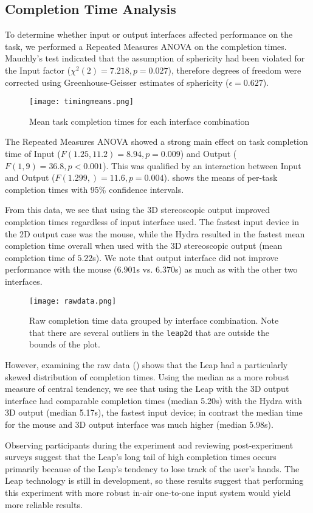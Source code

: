 \subsection{Completion Time Analysis}\label{sec:timing}
To determine whether input or output interfaces affected performance on the
task, we performed a Repeated Measures ANOVA on the completion times.
Mauchly's test indicated that the assumption of sphericity had been violated
for the Input factor ($\chi^2(2) = 7.218, p = 0.027$), therefore degrees of
freedom were corrected using Greenhouse-Geisser estimates of sphericity
($\epsilon = 0.627$).

\begin{figure}
    \centering
    \texttt{[image: timingmeans.png]}
    \caption{Mean task completion times for each interface combination}
    \label{fig:means}
\end{figure}

The Repeated Measures ANOVA showed a strong main effect on task
completion time of Input ($F(1.25,11.2) = 8.94, p = 0.009$) and Output ($F(1,9)
= 36.8, p < 0.001$). This was qualified by an interaction between Input and
Output ($F(1.299,) = 11.6, p = 0.004$).  shows the means
of per-task completion times with 95\% confidence intervals.

From this data, we see that using the 3D stereoscopic output improved
completion times regardless of input interface used. The fastest input device in
the 2D output case was the mouse, while the Hydra resulted in the fastest mean
completion time overall when used with the 3D stereoscopic output (mean
completion time of $5.22$s).
We note that output interface did not improve performance with the mouse
($6.901$s vs. $6.370$s) as much as with the other two interfaces.

\begin{figure*}
    \centering
    \texttt{[image: rawdata.png]}
    \caption{Raw completion time data grouped by interface combination.
             Note that there are several outliers in the {\tt leap2d} that
             are outside the bounds of the plot.}
    \label{fig:rawtimes}
\end{figure*}

However, examining the raw data () shows that
the Leap had a particularly skewed distribution of completion times.
Using the median as a more robust measure of central tendency, we see
that using the Leap with the 3D output interface had comparable completion
times (median 5.20s) with the Hydra with 3D output (median 5.17s), the
fastest input device; in contrast the median time for the mouse and 3D output
interface was much higher (median 5.98s).

Observing participants during the experiment and reviewing post-experiment
surveys suggest that the Leap's long tail of high completion times occurs
primarily because of the Leap's tendency to lose track of the user's hands.
The Leap technology is still in development, so these results suggest that
performing this experiment with more robust in-air one-to-one input
system would yield more reliable results.
